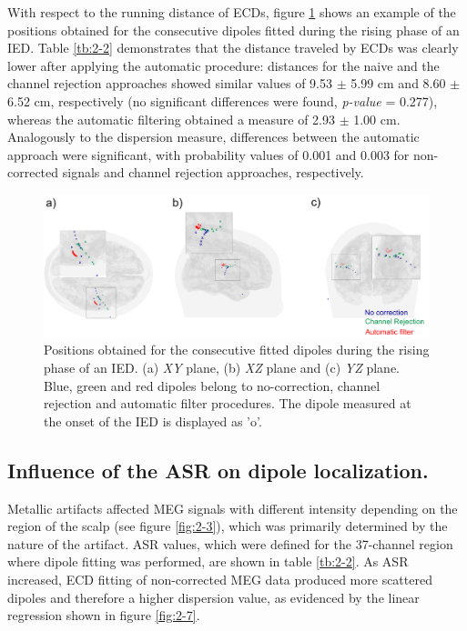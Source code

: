 With respect to the running distance of ECDs, figure \ref{fig:2-6} shows an example of the positions obtained for the consecutive dipoles fitted during the rising phase of an IED. Table \ref{tb:2-2} demonstrates that the distance traveled by ECDs was clearly lower after applying the automatic procedure: distances for the naive and the channel rejection approaches showed similar values of 9.53 $\pm$ 5.99 cm and 8.60 $\pm$ 6.52 cm, respectively (no significant differences were found, \textit{p-value} = 0.277), whereas the automatic filtering obtained a measure of 2.93 $\pm$ 1.00 cm. Analogously to the dispersion measure, differences between the automatic approach were significant, with probability values of 0.001 and 0.003 for non-corrected signals and channel rejection approaches, respectively.

\begin{figure}[h]
\centering
\includegraphics[width=1\textwidth]{Images/fig2-6.png}
\caption{Positions obtained for the consecutive fitted dipoles during the rising phase of an IED. (a) \textit{XY} plane, (b) \textit{XZ} plane and (c) \textit{YZ} plane. Blue, green and red dipoles belong to no-correction, channel rejection and automatic filter procedures. The dipole measured at the onset of the IED is displayed as 'o'.}
\label{fig:2-6}
\end{figure} 

\subsection{Influence of the ASR on dipole localization.}

Metallic artifacts affected MEG signals with different intensity depending on the region of the scalp (see figure \ref{fig:2-3}), which was primarily determined by the nature of the artifact. ASR values, which were defined for the 37-channel region where dipole fitting was performed, are shown in table \ref{tb:2-2}. As ASR increased, ECD fitting of non-corrected MEG data produced more scattered dipoles and therefore a higher dispersion value, as evidenced by the linear regression shown in figure \ref{fig:2-7}.

